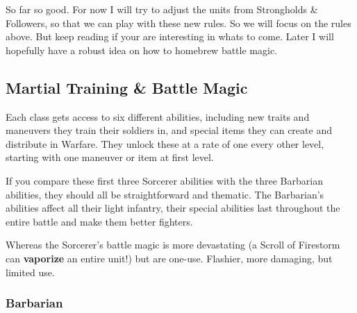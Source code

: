 \documentclass[letterpaper,twocolumn,openany,nodeprecatedcode]{dndbook}
\begin{document}



\begin{DndComment}{So far so good.}
    For now I will try to adjust the units from Strongholds \& Followers, so that we can play with these new rules.
    So we will focus on the rules above. But keep reading if your are interesting in whats to come.
    Later I will hopefully have a robust idea on how to homebrew battle magic.
\end{DndComment}


\subsection{Martial Training \& Battle Magic}

Each class gets access to six different abilities, including new traits and maneuvers they train their soldiers in, and special items they can create and distribute in Warfare. They unlock these at a rate of one every other level, starting with one maneuver or item at first level.

If you compare these first three Sorcerer abilities with the three Barbarian abilities, they should all be straightforward and thematic. The Barbarian’s abilities affect all their light infantry, their special abilities last throughout the entire battle and make them better fighters.

Whereas the Sorcerer’s battle magic is more devastating (a Scroll of Firestorm can \textbf{vaporize} an entire unit!) but are one-use. Flashier, more damaging, but limited use.


\subsubsection{Barbarian}
\end{document}
